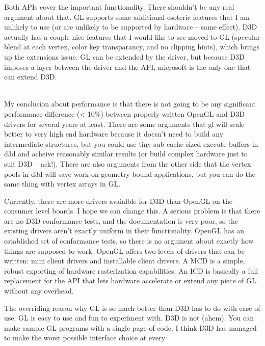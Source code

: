 \begin{allintypewriter}
\par
Both APIs cover the important functionality. There shouldn't be any real argument about 
that. GL supports some additional esoteric features that I am unlikely to use (or are 
unlikely to be supported by hardware -- same effect). D3D actually has a couple nice 
features that I would like to see moved to GL (specular blend at each vertex, color key 
transparancy, and no clipping hints), which brings up the extensions issue. GL can be 
extended by the driver, but because D3D imposes a layer between the driver and the API, 
microsoft is the only one that can extend D3D.\\ \\ 
\par
My conclusion about performance is that there is not going to be any significant 
performance difference (< 10\%) between properly written OpenGL and D3D drivers for several 
years at least. There are some arguments that gl will scale better to very high end hardware 
because it doesn't need to build any intermediate structures, but you could use tiny sub 
cache sized execute buffers in d3d and acheive reasonably similar results (or build complex 
hardware just to suit D3D -- ack!). There are also arguments from the other side that the 
vertex pools in d3d will save work on geometry bound applications, but you can do the same 
thing with vertex arrays in GL.\\ 
\par
Currently, there are more drivers avaialble for D3D than OpenGL on the consumer level boards. 
I hope we can change this. A serious problem is that there are no D3D conformance tests, and 
the documentation is very poor, so the existing drivers aren't exactly uniform in their 
functionality. OpenGL has an established set of conformance tests, so there is no argument 
about exactly how things are supposed to work. OpenGL offers two levels of drivers that can be 
written: mini client drivers and installable client drivers. A MCD is a simple, robust exporting 
of hardware rasterization capabilities. An ICD is basically a full replacement for the API that 
lets hardware accelerate or extend any piece of GL without any overhead.\\ 
\par
The overriding reason why GL is so much better than D3D has to do with ease of use. GL is easy 
to use and fun to experiment with. D3D is not (ahem). You can make sample GL programs with a 
single page of code. I think D3D has managed to make the worst possible interface choice at every 

\end{allintypewriter}
